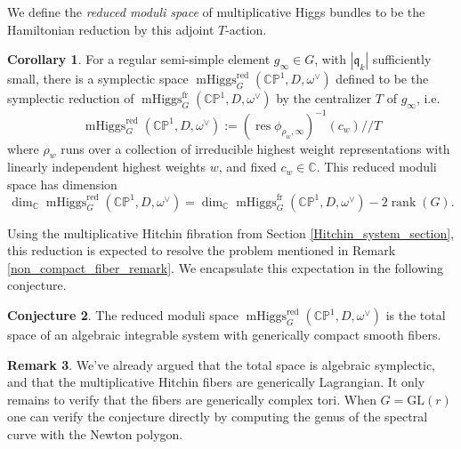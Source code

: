 \documentclass[11pt, oneside, reqno]{amsart}
\theoremstyle{definition} \newtheorem{definition}{Definition}[section]
\newtheorem{conjecture}[definition]{Conjecture}
\newtheorem{corollary}[definition]{Corollary}
\theoremstyle{definition} \newtheorem{remark}[definition]{Remark}
\theoremstyle{definition} \newtheorem{remarks}[definition]{Remarks}
\theoremstyle{definition} \newtheorem{question}[definition]{Question}
\theoremstyle{definition} \newtheorem*{note}{Note}
\theoremstyle{definition} \newtheorem{example}[definition]{Example}
\theoremstyle{definition} \newtheorem{examples}[definition]{Examples}
\newcommand{\qq}{\mathfrak{q}}
\newcommand{\bb}[1]{\mathbb{#1}}
\newcommand{\GL}{\mathrm{GL}}
\DeclareMathOperator{\rank}{rank}
\DeclareMathOperator{\res}{res}
\DeclareMathOperator{\mhiggs}{mHiggs}
\newcommand{\fr}{\mathrm{fr}}
\newcommand{\red}{\mathrm{red}}
\begin{document}
We define the \emph{reduced moduli space} of multiplicative Higgs bundles to be the Hamiltonian reduction by this adjoint $T$-action.

\begin{corollary}
  For a regular semi-simple element $g_\infty \in G$, with $|\qq_k|$ sufficiently small, there is a symplectic space $\mhiggs^\red_G(\bb{CP}^1, D, \omega^\vee)$ defined to be the symplectic reduction of $\mhiggs^\fr_G(\bb{CP}^1, D, \omega^\vee)$ by the centralizer $T$ of $g_\infty$, i.e.
  \[\mhiggs^\red_G(\bb{CP}^1, D, \omega^\vee) := (\res \phi_{\rho_{w}, \infty} )^{-1} (c_{w}) // T\]
  where $\rho_{w}$ runs over a collection of irreducible highest weight representations with linearly independent highest weights $w$,  and fixed $c_{w} \in \mathbb{C}$. This reduced moduli space has dimension
  \begin{equation}
    \label{eq:dim-reduced}
\dim_{\mathbb{C}} \mhiggs^\red_G(\bb{CP}^1, D, \omega^\vee)  =    \dim_{\mathbb{C}}  \mhiggs^\fr_G(\bb{CP}^1, D, \omega^\vee) - 2 \rank(G).
    \end{equation}
\end{corollary}

Using the multiplicative Hitchin fibration from Section \ref{Hitchin_system_section}, this reduction is expected to resolve the problem mentioned in Remark \ref{non_compact_fiber_remark}.  We encapsulate this expectation in the following conjecture.

\begin{conjecture}
The reduced moduli space $\mhiggs^\red_G(\bb{CP}^1, D, \omega^\vee)$ is the total space of an algebraic integrable system with generically compact smooth fibers.
\end{conjecture}

\begin{remark}
We've already argued that the total space is algebraic symplectic, and that the multiplicative Hitchin fibers are generically Lagrangian.  It only remains to verify that the fibers are generically complex tori.  When $G = \GL(r)$ one can verify the conjecture directly by computing the genus of the spectral curve with the Newton polygon. 
\end{remark}
\end{document}
